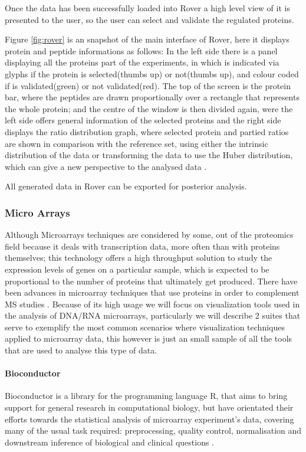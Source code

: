 Once the data has been successfully loaded into Rover a high level view of it is presented to the user, so the user can select and validate the regulated proteins. 

Figure \ref{fig:rover} is an snapshot of the main interface of Rover, here it displays protein and peptide informations as follows: In the left side there is a panel displaying all the proteins part of the experiments, in which is indicated via glyphs if the protein is selected(thumbs up) or not(thumbs up), and colour coded if is validated(green) or not validated(red). The top of the screen is the protein bar, where the peptides are drawn proportionally over a rectangle that represents the whole protein; and the centre of the window is then divided again, were the left side offers general information of the selected proteins and the right side displays the ratio distribution graph, where selected protein and partied ratios are shown in comparison with the reference set, using either the intrinsic distribution of the data or transforming the data to use the Huber distribution, which can give a new perspective to the analysed data \cite{COL2010}.

All generated data in Rover can be exported for posterior analysis.

\subsubsection{Micro Arrays}
Although Microarrays techniques are considered by some, out of the proteomics field because it deals with transcription data, more often than with proteins themselves; this technology offers a high throughput solution to study the expression levels of genes on a particular sample, which is expected to be proportional to the number of proteins that ultimately get produced. There have been advances in microarray techniques that use proteins in order to complement MS studies \cite{PRA2014}. Because of its high usage we will focus on visualization tools used in the analysis of DNA/RNA microarrays, particularly we will describe 2 suites that serve to exemplify the most common scenarios where visualization techniques applied to microarray data, this however is just an small sample of all the tools that are used to analyse this type of data.

\paragraph{Bioconductor}
Bioconductor is a library for the programming language R, that aims to bring support for general research in computational biology, but have orientated their efforts towards the statistical analysis of microarray experiment's data, covering many of the usual task required: preprocessing, quality control, normalisation and downstream inference of biological and clinical questions \cite{GEN2004}.

